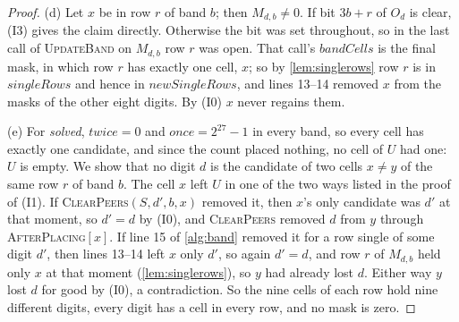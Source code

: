 \documentclass[11pt]{article}
\theoremstyle{definition}
\theoremstyle{plain}
\let\origtextsc\textsc
\renewcommand{\textsc}[1]{\textup{\origtextsc{#1}}}
\begin{document}
\begin{proof}
(d) Let $x$ be in row $r$ of band $b$; then $M_{d,b}\neq 0$. If bit $3b+r$ of $O_d$ is clear, (I3) gives the claim
directly. Otherwise the bit was set throughout, so in the last call of \textsc{UpdateBand} on $M_{d,b}$ row $r$ was
open. That call's $\mathit{bandCells}$ is the final mask, in which row $r$ has exactly one cell, $x$; so by
\cref{lem:singlerows} row $r$ is in $\mathit{singleRows}$ and hence in $\mathit{newSingleRows}$, and lines 13--14
removed $x$ from the masks of the other eight digits. By (I0) $x$ never regains them.

(e) For \emph{solved}, $\mathit{twice}=0$ and $\mathit{once}=2^{27}-1$ in every band, so every cell has exactly one
candidate, and since the count placed nothing, no cell of $U$ had one: $U$ is empty. We show that no digit $d$ is the
candidate of two cells $x\neq y$ of the same row $r$ of band $b$. The cell $x$ left $U$ in one of the two ways listed in
the proof of (I1). If \textsc{ClearPeers}$(S,d',b,x)$ removed it, then $x$'s only candidate was $d'$ at that moment, so
$d'=d$ by (I0), and \textsc{ClearPeers} removed $d$ from $y$ through \textsc{AfterPlacing}$[x]$. If line 15 of
\cref{alg:band} removed it for a row single of some digit $d'$, then lines 13--14 left $x$ only $d'$, so again $d'=d$,
and row $r$ of $M_{d,b}$ held only $x$ at that moment (\cref{lem:singlerows}), so $y$ had already lost $d$. Either way
$y$ lost $d$ for good by (I0), a contradiction. So the nine cells of each row hold nine different digits, every digit
has a cell in every row, and no mask is zero.
\end{proof}
\end{document}
